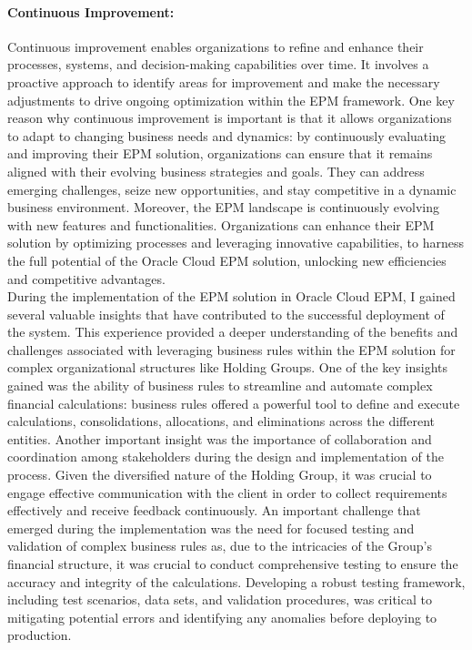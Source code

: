 \documentclass[12pt,a4paper,openright,twoside]{book}
\begin{document}
\paragraph{Continuous Improvement:}
Continuous improvement enables organizations to refine and enhance their processes, systems, and decision-making capabilities over time. 
%
It involves a proactive approach to identify areas for improvement and make the necessary adjustments to drive ongoing optimization within the EPM framework. 
%
One key reason why continuous improvement is important is that it allows organizations to adapt to changing business needs and dynamics: by continuously evaluating and improving their EPM solution, organizations can ensure that it remains aligned with their evolving business strategies and goals.
%
They can address emerging challenges, seize new opportunities, and stay competitive in a dynamic business environment.
%
Moreover, the EPM landscape is continuously evolving with new features and functionalities. 
%
Organizations can enhance their EPM solution by optimizing processes and leveraging innovative capabilities, to harness the full potential of the Oracle Cloud EPM solution, unlocking new efficiencies and competitive advantages.\\

During the implementation of the EPM solution in Oracle Cloud EPM, I gained several valuable insights that have contributed to the successful deployment of the system.
%
This experience provided a deeper understanding of the benefits and challenges associated with leveraging business rules within the EPM solution for complex organizational structures like Holding Groups.
%
One of the key insights gained was the ability of business rules to streamline and automate complex financial calculations: business rules offered a powerful tool to define and execute calculations, consolidations, allocations, and eliminations across the different entities. 
%
Another important insight was the importance of collaboration and coordination among stakeholders during the design and implementation of the process. 
%
Given the diversified nature of the Holding Group, it was crucial to engage effective communication with the client in order to collect requirements effectively and receive feedback continuously.
%
An important challenge that emerged during the implementation was the need for focused testing and validation of complex business rules as, due to the intricacies of the Group's financial structure, it was crucial to conduct comprehensive testing to ensure the accuracy and integrity of the calculations. 
%
Developing a robust testing framework, including test scenarios, data sets, and validation procedures, was critical to mitigating potential errors and identifying any anomalies before deploying to production.
\end{document}
